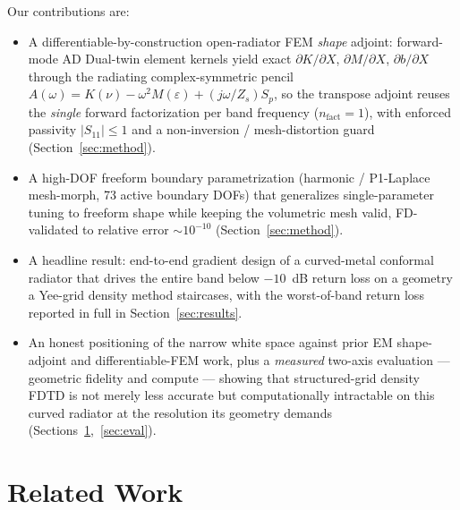 \documentclass{anvil-paper}
\begin{document}
Our contributions are:
\begin{itemize}
  \item A differentiable-by-construction open-radiator FEM \emph{shape} adjoint:
  forward-mode AD Dual-twin element kernels yield exact
  $\partial K/\partial X$, $\partial M/\partial X$, $\partial b/\partial X$
  through the radiating complex-symmetric pencil
  $A(\omega)=K(\nu)-\omega^2 M(\varepsilon)+(j\omega/Z_s)S_p$, so the transpose
  adjoint reuses the \emph{single} forward factorization per band frequency
  ($n_{\text{fact}}=1$), with enforced passivity $|S_{11}|\le 1$ and a
  non-inversion / mesh-distortion guard (Section~\ref{sec:method}).
  \item A high-DOF freeform boundary parametrization (harmonic / P1-Laplace
  mesh-morph, 73 active boundary DOFs) that generalizes single-parameter tuning
  to freeform shape while keeping the volumetric mesh valid, FD-validated to
  relative error $\sim\!10^{-10}$ (Section~\ref{sec:method}).
  \item A headline result: end-to-end gradient design of a curved-metal
  conformal radiator that drives the entire band below $-10$~dB return loss on a
  geometry a Yee-grid density method staircases, with the worst-of-band return
  loss reported in full in Section~\ref{sec:results}.
  \item An honest positioning of the narrow white space against prior EM
  shape-adjoint and differentiable-FEM work, plus a \emph{measured} two-axis
  evaluation --- geometric fidelity and compute --- showing that structured-grid
  density FDTD is not merely less accurate but computationally intractable on
  this curved radiator at the resolution its geometry demands
  (Sections~\ref{sec:related},~\ref{sec:eval}).
\end{itemize}

\section{Related Work}
\label{sec:related}
\end{document}
